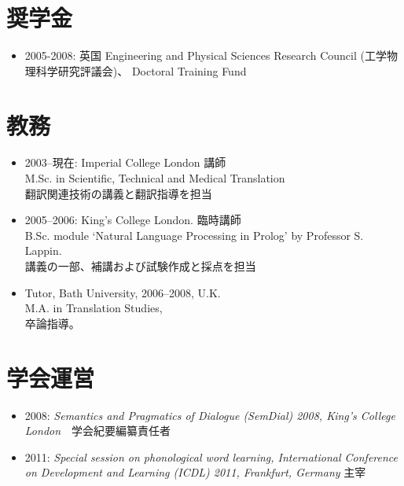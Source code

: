 \documentclass[a4paper]{article}
\begin{document}
\section*{奨学金}

\begin{itemize}

\item 2005-2008: 英国 Engineering and Physical Sciences Research Council (工学物理科学研究評議会)、 Doctoral Training Fund


\end{itemize}

\section*{教務}
\begin{itemize}

\item 2003--現在: Imperial College London 講師\\
   M.Sc. in Scientific, Technical and Medical Translation \\
   翻訳関連技術の講義と翻訳指導を担当

\item 2005--2006: King's College London. 臨時講師\\
    B.Sc. module `Natural Language Processing in Prolog' by Professor S. Lappin.\\
   講義の一部、補講および試験作成と採点を担当

\item Tutor, Bath University, 2006--2008, U.K.\\
   M.A. in Translation Studies, \\卒論指導。


\end{itemize}



\section*{学会運営}
\begin{itemize}
\item 2008: {\em Semantics and Pragmatics of Dialogue (SemDial) 2008, King's College London}　学会紀要編纂責任者 
\item  2011: {\em Special session on phonological word learning, International
    Conference on Development and Learning (ICDL) 2011, Frankfurt,
    Germany} 主宰

\end{itemize}
\end{document}
